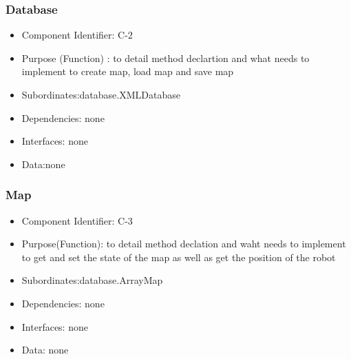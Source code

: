 \documentclass[11pt, a4paper]{report}
\begin{document}
\subsubsection{Database}
\begin{itemize}
\item Component Identifier: C-2 
\item Purpose (Function) : to detail method declartion and
what needs to implement to create map, load map and save map 
\item Subordinates:database.XMLDatabase
\item Dependencies: none
\item Interfaces: none
\item Data:none
\end{itemize}


\subsubsection{Map}
\begin{itemize}
\item Component Identifier:  C-3
\item Purpose(Function): to detail method declation and waht needs to implement 
to get and set the state of the map as well as get the position of the robot
\item Subordinates:database.ArrayMap
\item Dependencies: none
\item Interfaces: none
\item Data: none
\end{itemize}
\end{document}

